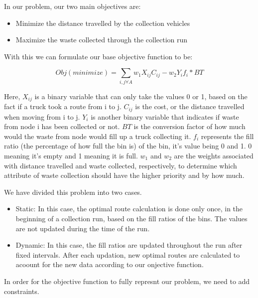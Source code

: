 \documentclass[12pt]{article}
\begin{document}
In our problem, our two main objectives are:
\begin{itemize}
    \item Minimize the distance travelled by the collection vehicles
    \item Maximize the waste collected through the collection run
\end{itemize}

With this we can formulate our base objective function to be:

\begin{equation}\label{eq1}
    Obj(minimize)=\sum_{i,j \forall A} w_1 X_{ij} C_{ij} - w_2 Y_i f_i * BT
\end{equation}

Here, $X_{ij}$ is a binary variable that can only take the values 0 or 1, based on the fact if a truck took a route from i to j. $C_{ij}$ is the cost, or the distance travelled when moving from i to j. $Y_{i}$ is another binary variable that indicates if waste from node i has been collected or not. $BT$ is the conversion factor of how much would the waste from node would fill up a truck collecting it. $f_i$ represents the fill ratio (the percentage of how full the bin is) of the bin, it's value being 0 and 1. 0 meaning it's empty and 1 meaning it is full. $w_1$ and $w_2$ are the weights associated with distance travelled and waste collected, respectively, to determine which attribute of waste collection should have the higher priority and by how much. 

We have divided this problem into two cases.
\begin{itemize}
    \item Static: In this case, the optimal route calculation is done only once, in the beginning of a collection run, based on the fill ratios of the bins. The values are not updated during the time of the run.
    \item Dynamic: In this case, the fill ratios are updated throughout the run after fixed intervals. After each updation, new optimal routes are calculated to acoount for the new data according to our onjective function.
\end{itemize}

In order for the objective function to fully represnt our problem, we need to add constraints.
\end{document}
